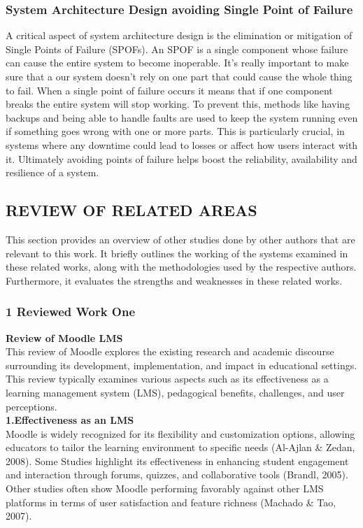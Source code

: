 \documentclass[a4paper,12pt]{article}  %
\begin{document}
\subsubsection{System Architecture Design avoiding Single Point of Failure}
A critical aspect of system architecture design is the elimination or
mitigation of Single Points of Failure (SPOFs). An SPOF is a single component
whose failure can cause the entire system to become inoperable. It's really
important to make sure that a our system doesn't rely on one part that could
cause the whole thing to fail. When a single point of failure occurs it means
that if one component breaks the entire system will stop working. To prevent
this, methods like having backups and being able to handle faults are used to
keep the system running even if something goes wrong with one or more parts.
This is particularly crucial, in systems where any downtime could lead to
losses or affect how users interact with it. Ultimately avoiding points of
failure helps boost the reliability, availability and resilience of a system.\\

\newpage
\subsection{REVIEW OF RELATED AREAS}
This section provides an overview of other studies done by other authors that
are relevant to this work. It briefly outlines the working of the systems
examined in these related works, along with the methodologies used by the
respective authors. Furthermore, it evaluates the strengths and weaknesses in
these related works.\\

\subsubsection{1 Reviewed Work One}
\large\textbf{Review of Moodle LMS}\\

This review of Moodle explores the existing research and academic discourse
surrounding its development, implementation, and impact in educational
settings. This review typically examines various aspects such as its
effectiveness as a learning management system (LMS), pedagogical benefits,
challenges, and user perceptions.\\

\textbf{1.Effectiveness as an LMS}\\
Moodle is widely recognized for its flexibility and customization options, allowing educators to tailor the learning environment to specific needs (Al-Ajlan \& Zedan, 2008). Some Studies highlight its effectiveness in enhancing student engagement and interaction through forums, quizzes, and collaborative tools (Brandl, 2005). Other studies often show Moodle performing favorably against other LMS platforms in terms of user satisfaction and feature richness (Machado \& Tao, 2007).\\
\end{document}
